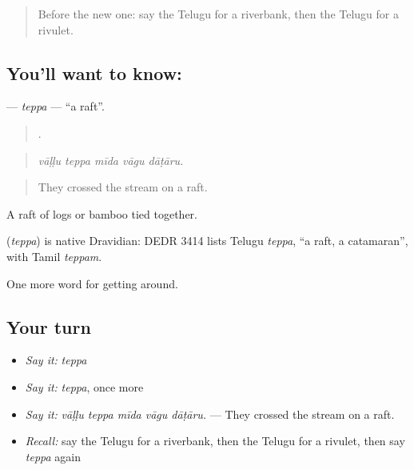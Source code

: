 \label{lesson:TE-C453-teppa}



\begin{quote}
Before the new one: say the Telugu for a riverbank, then the Telugu for a rivulet.
\end{quote}

\subsection*{You'll want to know: }
\textbf{} — \emph{teppa} — \textquotedblleft{}a raft\textquotedblright{}.

\begin{quote}
    .
\end{quote}

\begin{quote}
\emph{vāḷḷu teppa mīda vāgu dāṭāru.}
\end{quote}

\begin{quote}
They crossed the stream on a raft.
\end{quote}

A raft of logs or bamboo tied together.

\begin{cousinweb}
\textbf{} (\emph{teppa}) is native Dravidian: DEDR 3414 lists Telugu \emph{teppa}, \textquotedblleft{}a raft, a catamaran\textquotedblright{}, with Tamil \emph{teppam}.
\end{cousinweb}

\begin{grammarlens}[title={What you've built}]
One more word for getting around.
\end{grammarlens}

\subsection*{Your turn}
\begin{itemize}
\raggedright
  \item \emph{Say it:} \emph{teppa}
  \item \emph{Say it:} \emph{teppa}, once more
  \item \emph{Say it:} \emph{vāḷḷu teppa mīda vāgu dāṭāru.} — They crossed the stream on a raft.
  \item \emph{Recall:} say the Telugu for a riverbank, then the Telugu for a rivulet, then say \emph{teppa} again
\end{itemize}

